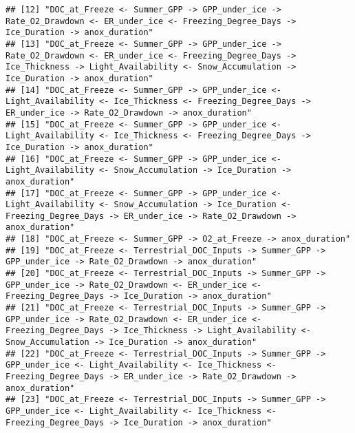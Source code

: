 \documentclass[]{article}
\begin{document}
\begin{verbatim}
## [12] "DOC_at_Freeze <- Summer_GPP -> GPP_under_ice -> Rate_O2_Drawdown <- ER_under_ice <- Freezing_Degree_Days -> Ice_Duration -> anox_duration"                                                                                      
## [13] "DOC_at_Freeze <- Summer_GPP -> GPP_under_ice -> Rate_O2_Drawdown <- ER_under_ice <- Freezing_Degree_Days -> Ice_Thickness -> Light_Availability <- Snow_Accumulation -> Ice_Duration -> anox_duration"                          
## [14] "DOC_at_Freeze <- Summer_GPP -> GPP_under_ice <- Light_Availability <- Ice_Thickness <- Freezing_Degree_Days -> ER_under_ice -> Rate_O2_Drawdown -> anox_duration"                                                               
## [15] "DOC_at_Freeze <- Summer_GPP -> GPP_under_ice <- Light_Availability <- Ice_Thickness <- Freezing_Degree_Days -> Ice_Duration -> anox_duration"                                                                                   
## [16] "DOC_at_Freeze <- Summer_GPP -> GPP_under_ice <- Light_Availability <- Snow_Accumulation -> Ice_Duration -> anox_duration"                                                                                                       
## [17] "DOC_at_Freeze <- Summer_GPP -> GPP_under_ice <- Light_Availability <- Snow_Accumulation -> Ice_Duration <- Freezing_Degree_Days -> ER_under_ice -> Rate_O2_Drawdown -> anox_duration"                                           
## [18] "DOC_at_Freeze <- Summer_GPP -> O2_at_Freeze -> anox_duration"                                                                                                                                                                   
## [19] "DOC_at_Freeze <- Terrestrial_DOC_Inputs -> Summer_GPP -> GPP_under_ice -> Rate_O2_Drawdown -> anox_duration"                                                                                                                    
## [20] "DOC_at_Freeze <- Terrestrial_DOC_Inputs -> Summer_GPP -> GPP_under_ice -> Rate_O2_Drawdown <- ER_under_ice <- Freezing_Degree_Days -> Ice_Duration -> anox_duration"                                                            
## [21] "DOC_at_Freeze <- Terrestrial_DOC_Inputs -> Summer_GPP -> GPP_under_ice -> Rate_O2_Drawdown <- ER_under_ice <- Freezing_Degree_Days -> Ice_Thickness -> Light_Availability <- Snow_Accumulation -> Ice_Duration -> anox_duration"
## [22] "DOC_at_Freeze <- Terrestrial_DOC_Inputs -> Summer_GPP -> GPP_under_ice <- Light_Availability <- Ice_Thickness <- Freezing_Degree_Days -> ER_under_ice -> Rate_O2_Drawdown -> anox_duration"                                     
## [23] "DOC_at_Freeze <- Terrestrial_DOC_Inputs -> Summer_GPP -> GPP_under_ice <- Light_Availability <- Ice_Thickness <- Freezing_Degree_Days -> Ice_Duration -> anox_duration"                                                         

\end{verbatim}
\end{document}
